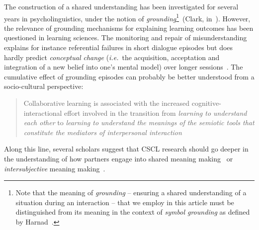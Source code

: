 \documentclass{sig-alternate}
\newcommand{\ie}{{\textit{i.e.~}}}
\begin{document}
The construction of a shared understanding has been investigated for several
years in psycholinguistics, under the  notion of \emph{grounding}\footnote{Note
that the meaning of \emph{grounding} -- ensuring a shared understanding of a
situation during an interaction -- that we employ in this article must be
distinguished from its meaning in the context of \emph{symbol grounding} as
defined by Harnad~\cite{harnad1990symbol}.}~(Clark,
in~\cite{clark1986referring}).  However, the relevance of grounding mechanisms
for explaining learning outcomes has been questioned in learning sciences. The
monitoring and repair of misunderstanding explains for instance referential
failures in short dialogue episodes but does hardly predict \emph{conceptual
change} (\ie the acquisition, acceptation and integration of a new belief into
one's mental model) over longer
sessions~\cite{dillenbourg2006sharing}. The cumulative effect of grounding
episodes can probably be better understood from a socio-cultural perspective:

\begin{quote}
Collaborative learning is associated with the increased
cognitive-interactional effort involved in the transition from \emph{learning to
understand each other} to \emph{learning to understand the meanings of the semiotic
tools that constitute the mediators of interpersonal
interaction}~\cite{baker1999role}
\end{quote}

Along this line, several scholars suggest that CSCL research should go deeper in
the understanding of how partners engage into shared meaning
making~\cite{stahl2007meaning} or \emph{intersubjective} meaning
making~\cite{suthers2006technology}.
\end{document}
